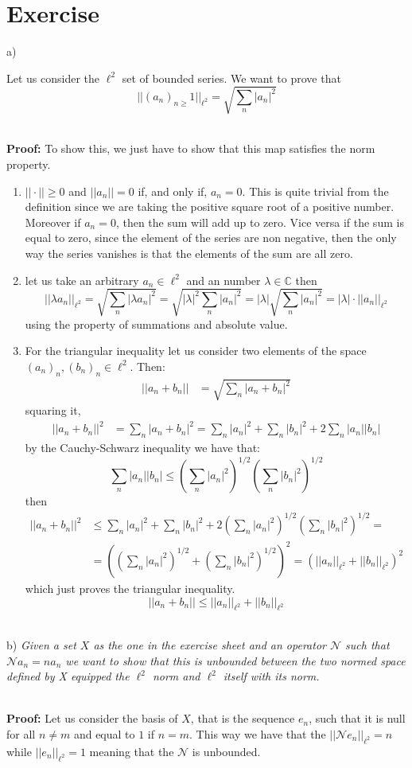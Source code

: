 \documentclass{article}
\newcommand{\C}{\mathbb{C}}
\newcommand{\ex}{\textit}
\newcommand{\proof}{\\ \textbf{Proof: }}
\begin{document}
\section{Exercise}
a)
\begin{em}
Let us consider the $\ell^2$ set of bounded series. We want to prove that 
\[
||(a_n)_{n\geq}1||_{\ell^2} = \sqrt{\sum_n |a_n|^2}
\]
\end{em}

\proof To show this, we just have to show that this map satisfies the norm property.
\begin{enumerate} [label = \roman*)]
    \item $||\cdot || \geq 0$ and $||a_n|| = 0$ if, and only if, $a_n = 0$. This is quite trivial from the definition since we are taking the positive square root of a positive number. Moreover if $a_n = 0$, then the sum will add up to zero. Vice versa if the sum is equal to zero, since the element of the series are non negative, then the only way the series vanishes is that the elements of the sum are all zero.
    \item let us take an arbitrary $a_n \in \ell^2$ and an number $\lambda \in \C$ then
    \[
        ||\lambda a_n||_{\ell^2} = \sqrt{\sum_n|\lambda a_n|^2} =  \sqrt{ |\lambda|^2 \sum_n |a_n|^2} = |\lambda|\sqrt{ \sum_n |a_n|^2} = |\lambda| \cdot||a_n||_{\ell^2}
    \]
    using the property of summations and absolute value.
    \item For the triangular inequality let us consider two elements of the space $(a_n)_n, (b_n)_n \in \ell^2$. Then:
    \[
        \begin{split}
            ||a_n +b_n || &= \sqrt{\sum_n |a_n +b_n |^2}
        \end{split}
    \]
    squaring it,
    \[
        \begin{split}
            ||a_n +b_n ||^2 &= \sum_n |a_n +b_n |^2 = \sum_n |a_n|^2 + \sum_n |b_n|^2 + 2 \sum_n |a_n||b_n|
        \end{split}
    \]
    by the Cauchy-Schwarz inequality we have that:
    \[
        \sum_n |a_n||b_n| \leq \left( \sum_n |a_n|^2 \right)^{1/2} \left( \sum_n |b_n|^2 \right)^{1/2}
    \]
    then
    \[
        \begin{split}
            ||a_n +b_n ||^2 &\leq \sum_n |a_n|^2 + \sum_n |b_n|^2 + 2 \left( \sum_n |a_n|^2 \right)^{1/2} \left( \sum_n |b_n|^2 \right)^{1/2} = \\
            & = \left( \left( \sum_n |a_n|^2 \right)^{1/2} + \left( \sum_n |b_n|^2 \right)^{1/2} \right)^2 = \left( ||a_n||_{\ell^2} + ||b_n||_{\ell^2}  \right)^2
        \end{split}
    \]
    which just proves the triangular inequality.
    \[
        ||a_n +b_n || \leq ||a_n||_{\ell^2} + ||b_n||_{\ell^2} 
    \]
\end{enumerate}
\\
b) \ex{Given a set $X$ as the one in the exercise sheet and an operator $\mathcal N$ such that $\mathcal{N} a_n = n a_n$ we want to show that this is unbounded between the two normed space defined by X equipped the $\ell^2$ norm and $\ell^2$ itself with its norm.}

\proof Let us consider the basis of $X$, that is the sequence $e_n$, such that it is null for all $n \neq m$ and equal to $1$ if $n = m$.  This way we have that the $||\mathcal N e_n||_{\ell^2} = n$ while $||e_n||_{\ell^2} = 1$ meaning that the $\mathcal N$ is unbounded.
\end{document}
